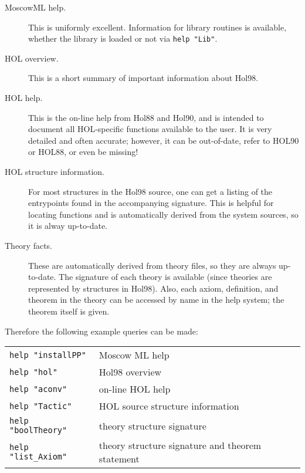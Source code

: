 \documentclass[12pt,fleqn,a4paper]{report}
\begin{document}
 \begin{description}

 \item [MoscowML help.] This is uniformly excellent. Information for
   library routines is available, whether the library is loaded or not
   via \verb+help "Lib"+.

\item [HOL overview.] This is a short summary of important information
  about Hol98.

\item [HOL help.] This is the on-line help from Hol88 and Hol90, and
  is intended to document all HOL-specific functions available to the
  user. It is very detailed and often accurate; however, it can be
  out-of-date, refer to HOL90 or HOL88, or even be missing!

\item [HOL structure information.]  For most structures in the Hol98
  source, one can get a listing of the entrypoints found in the
  accompanying signature. This is helpful for locating functions and
  is automatically derived from the system sources, so it is alway
  up-to-date.

\item [Theory facts.] These are automatically derived from theory
  files, so they are always up-to-date. The signature of each theory
  is available (since theories are represented by structures in
  Hol98). Also, each axiom, definition, and theorem in the theory can
  be accessed by name in the help system; the theorem itself is given.
 \end{description}

 Therefore the following example queries can be made:

 \begin{table}[h]
\begin{center}
 \begin{tabular}{|l|l|} \hline
  \verb+help "installPP"+ & Moscow ML help \\
  \verb+help "hol"+ &  Hol98 overview \\
  \verb+help "aconv"+ &  on-line HOL help \\
  \verb+help "Tactic"+ & HOL source structure information \\
  \verb+help "boolTheory"+ &  theory structure signature \\
  \verb+help "list_Axiom"+ & theory structure signature and theorem
 statement \\ \hline
 \end{tabular}
\end{center}
 \end{table}
\end{document}
